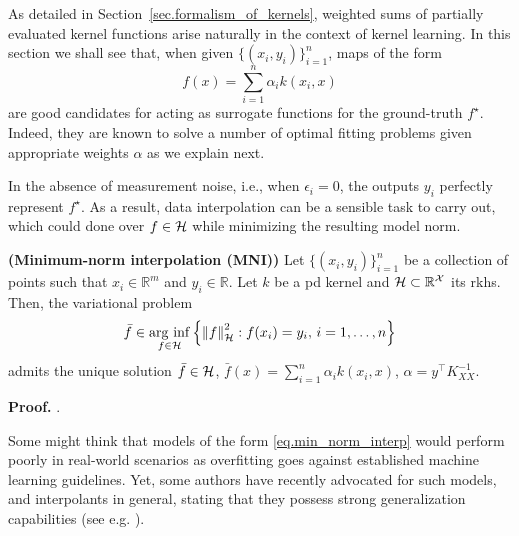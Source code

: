 As detailed in Section~\ref{sec.formalism_of_kernels}, weighted sums of partially evaluated kernel functions arise naturally in the context of kernel learning. In this section we shall see that, when given $\{(x_i,y_i)\}_{i=1}^n$, maps of the form
\begin{equation}
	f(x) = \sum_{i=1}^n \alpha_i k(x_i,x)
\end{equation}
are good candidates for acting as surrogate functions for the ground-truth $f^\star$. Indeed, they are known to solve a number of optimal fitting problems given appropriate weights $\alpha$ as we explain next.

In the absence of measurement noise, i.e., when $\epsilon_i = 0$, the outputs $y_i$ perfectly represent $f^\star$. As a result, data interpolation can be a sensible task to carry out, which could done over $f \in \mathcal{H}$ while minimizing the resulting model norm.
\begin{proposition}
	\label{prop.MNI}
	\textbf{(Minimum-norm interpolation (MNI))}
	Let $\{(x_i,y_i)\}_{i=1}^n$ be a collection of points such that $x_i \in \mathbb{R}^m$ and $y_i \in \mathbb{R}$. Let $k$ be a \ac{pd} kernel and $\mathcal{H} \subset \mathbb{R}^\mathcal{X}$ its \ac{rkhs}. Then, the variational problem
	\begin{equation}
		\label{eq.min_norm_interp}
			\bar{f} \in \operatorname*{\arg\,\inf}_{f \in \mathcal{H}} \left\{ \left\| f \right\|_\mathcal{H}^2 : f(x_i) = y_i, \, i = 1,\dots,n \right\}
	\end{equation}
	admits the unique solution $\bar f \in \mathcal{H}$, $\bar f(x) =  \sum_{i=1}^n \alpha_i k(x_i,x)$, $\alpha = y^\top K_{XX}^{-1}$.
\end{proposition}
\begin{my_proof}
	\textbf{Proof.}
	\cite[Theorem~3.5]{kanagawa2018gaussian}.
\end{my_proof}

\begin{remark}
	Some might think that models of the form \eqref{eq.min_norm_interp} would perform poorly in real-world scenarios as overfitting goes against established machine learning guidelines. Yet, some authors have recently advocated for such models, and interpolants in general, stating that they possess strong generalization capabilities (see e.g. \cite{belkin2018understand,belkin2019reconciling,beaglehole2022kernel}).
\end{remark}

